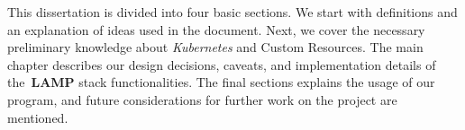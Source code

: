 This dissertation is divided into four basic sections. We start with definitions
and an explanation of ideas used in the document. Next, we cover the necessary
preliminary knowledge about \textit{Kubernetes} and Custom Resources. The main
chapter describes our design decisions, caveats, and implementation details of
the~\textbf{LAMP} stack functionalities. The final sections explains the usage
of our program, and future considerations for further work on the project are
mentioned.
